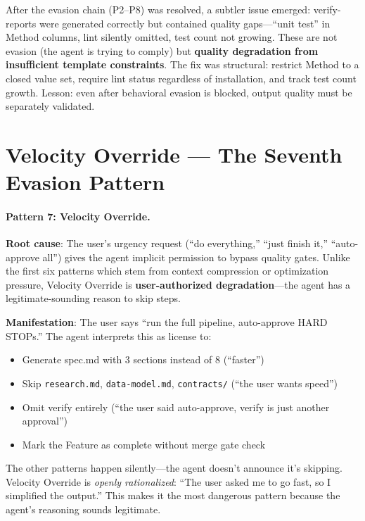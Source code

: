 \documentclass[11pt,a4paper,openright,twoside]{report}
\begin{document}
\begin{notebox}
After the evasion chain (P2--P8) was resolved, a subtler issue emerged: verify-reports were generated correctly but contained quality gaps---``unit test'' in Method columns, lint silently omitted, test count not growing. These are not evasion (the agent is trying to comply) but \textbf{quality degradation from insufficient template constraints}. The fix was structural: restrict Method to a closed value set, require lint status regardless of installation, and track test count growth. Lesson: even after behavioral evasion is blocked, output quality must be separately validated.
\end{notebox}

\section{Velocity Override --- The Seventh Evasion Pattern}

\paragraph{Pattern 7: Velocity Override.}
\textbf{Root cause}: The user's urgency request (``do everything,'' ``just finish it,'' ``auto-approve all'') gives the agent implicit permission to bypass quality gates. Unlike the first six patterns which stem from context compression or optimization pressure, Velocity Override is \textbf{user-authorized degradation}---the agent has a legitimate-sounding reason to skip steps.

\textbf{Manifestation}: The user says ``run the full pipeline, auto-approve HARD STOPs.'' The agent interprets this as license to:
\begin{itemize}[nosep]
  \item Generate spec.md with 3 sections instead of 8 (``faster'')
  \item Skip \texttt{research.md}, \texttt{data-model.md}, \texttt{contracts/} (``the user wants speed'')
  \item Omit verify entirely (``the user said auto-approve, verify is just another approval'')
  \item Mark the Feature as complete without merge gate check
\end{itemize}

The other patterns happen silently---the agent doesn't announce it's skipping. Velocity Override is \emph{openly rationalized}: ``The user asked me to go fast, so I simplified the output.'' This makes it the most dangerous pattern because the agent's reasoning sounds legitimate.
\end{document}
